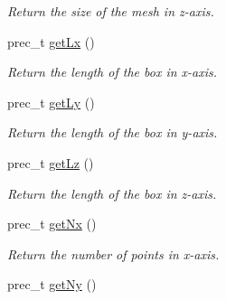 \begin{CompactItemize}
\begin{CompactList}\small\item\em Return the size of the mesh in z-axis. \item\end{CompactList}\item 
\hypertarget{classBoxKnots_6ea52b76479b143b3d73219d9c1254b6}{
prec\_\-t \hyperlink{classBoxKnots_6ea52b76479b143b3d73219d9c1254b6}{getLx} ()}
\label{classBoxKnots_6ea52b76479b143b3d73219d9c1254b6}

\begin{CompactList}\small\item\em Return the length of the box in x-axis. \item\end{CompactList}\item 
\hypertarget{classBoxKnots_9289f8b4dc805a59de3fce50100e08b9}{
prec\_\-t \hyperlink{classBoxKnots_9289f8b4dc805a59de3fce50100e08b9}{getLy} ()}
\label{classBoxKnots_9289f8b4dc805a59de3fce50100e08b9}

\begin{CompactList}\small\item\em Return the length of the box in y-axis. \item\end{CompactList}\item 
\hypertarget{classBoxKnots_7b86ae694af6542cca1b12e0c9f753ed}{
prec\_\-t \hyperlink{classBoxKnots_7b86ae694af6542cca1b12e0c9f753ed}{getLz} ()}
\label{classBoxKnots_7b86ae694af6542cca1b12e0c9f753ed}

\begin{CompactList}\small\item\em Return the length of the box in z-axis. \item\end{CompactList}\item 
\hypertarget{classBoxKnots_44b133dec3f3883645a1cb26c315ab8e}{
prec\_\-t \hyperlink{classBoxKnots_44b133dec3f3883645a1cb26c315ab8e}{getNx} ()}
\label{classBoxKnots_44b133dec3f3883645a1cb26c315ab8e}

\begin{CompactList}\small\item\em Return the number of points in x-axis. \item\end{CompactList}\item 
\hypertarget{classBoxKnots_8292051411fcac39725faade3b1899e8}{
prec\_\-t \hyperlink{classBoxKnots_8292051411fcac39725faade3b1899e8}{getNy} ()}
\label{classBoxKnots_8292051411fcac39725faade3b1899e8}


\end{CompactItemize}
